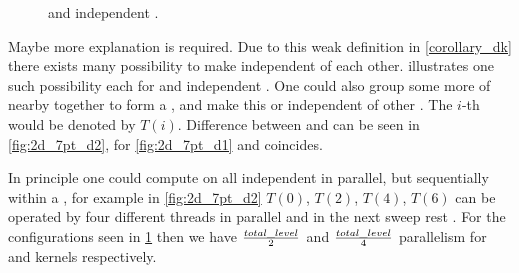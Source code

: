  \begin{figure}[tbhp]
 	\centering
 	\hspace{2.5em}
 	\caption{\DONE and \DTWO independent \levelGroups.}
 	\label{fig:2d-7pt_d1_d2}
 \end{figure}
 
  {\CA Maybe more explanation is required.} Due to this weak definition in \cref{corollary_dk} there exists many possibility to make \levels independent of each other.  illustrates one such possibility each for \DONE and \DTWO independent \levels. One could also group some more of nearby \levels together to form a \levelGroup, and make this \DONE or \DTWO independent of other \levelGroups. The $i$-th \levelGroup would be denoted by $T(i)$. Difference between \level and  \levelGroup can be seen in \cref{fig:2d_7pt_d2}, for \cref{fig:2d_7pt_d1} \levelGroup and \level coincides.
  
  In principle one could compute on all independent \levelGroups in parallel, but sequentially within a \levelGroup, \ie for example in \cref{fig:2d_7pt_d2} $T(0)$, $T(2)$, $T(4)$, $T(6)$ can be operated by four different threads in parallel and in the next sweep rest \levelGroups. For the configurations seen in \cref{fig:2d-7pt_d1_d2} then we have $\frac{total\_level}{2}$ and $\frac{total\_level}{4}$ parallelism for \DONE and \DTWO kernels respectively.
  
